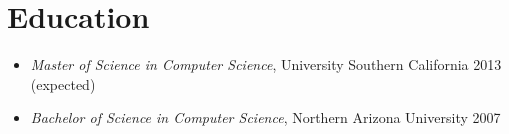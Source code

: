 \documentclass[11pt]{article}
\begin{document}
\section*{Education}
\label{sec-4}

\begin{itemize}
\item \emph{Master of Science in Computer Science}, University Southern California 2013 (expected)
\item \emph{Bachelor of Science in Computer Science}, Northern Arizona University 2007
\end{itemize}
\end{document}
